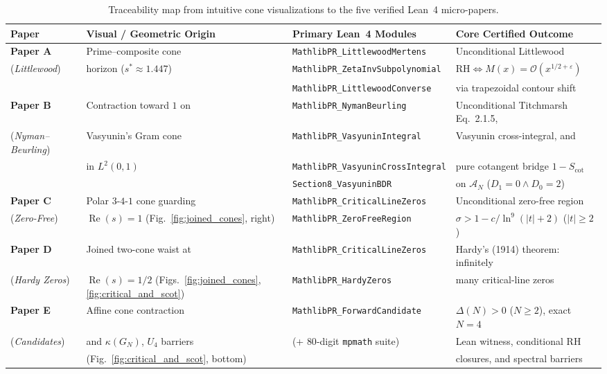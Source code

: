 \documentclass[11pt,a4paper]{article}
\begin{document}
\begin{table}[h!]
\centering
\scriptsize
\setlength{\tabcolsep}{2.2pt}
\begin{tabular}{@{}llll@{}}
\toprule
\textbf{Paper} & \textbf{Visual / Geometric Origin} & \textbf{Primary Lean~4 Modules} & \textbf{Core Certified Outcome} \\
\midrule
\textbf{Paper A} & Prime--composite cone & \texttt{MathlibPR\_LittlewoodMertens} & Unconditional Littlewood \\
(\emph{Littlewood}) & horizon ($s^* \approx 1.447$) & \texttt{MathlibPR\_ZetaInvSubpolynomial} & $\mathrm{RH} \iff M(x) = \mathcal{O}(x^{1/2+\varepsilon})$ \\
 & & \texttt{MathlibPR\_LittlewoodConverse} & via trapezoidal contour shift \\
\addlinespace[0.4em]
\textbf{Paper B} & Contraction toward $1$ on & \texttt{MathlibPR\_NymanBeurling} & Unconditional Titchmarsh Eq.~2.1.5, \\
(\emph{Nyman--Beurling}) & Vasyunin's Gram cone & \texttt{MathlibPR\_VasyuninIntegral} & Vasyunin cross-integral, and \\
 & in $L^2(0,1)$ & \texttt{MathlibPR\_VasyuninCrossIntegral} & pure cotangent bridge $1 - S_{\mathrm{cot}}$ \\
 & & \texttt{Section8\_VasyuninBDR} & on $\mathcal{A}_N$ ($D_1 = 0 \land D_0 = 2$) \\
\addlinespace[0.4em]
\textbf{Paper C} & Polar $3$-$4$-$1$ cone guarding & \texttt{MathlibPR\_CriticalLineZeros} & Unconditional zero-free region \\
(\emph{Zero-Free}) & $\operatorname{Re}(s) = 1$ (Fig.~\ref{fig:joined_cones}, right) & \texttt{MathlibPR\_ZeroFreeRegion} & $\sigma > 1 - c/\ln^9(|t|+2)$ ($|t|\ge 2$) \\
\addlinespace[0.4em]
\textbf{Paper D} & Joined two-cone waist at & \texttt{MathlibPR\_CriticalLineZeros} & Hardy's (1914) theorem: infinitely \\
(\emph{Hardy Zeros}) & $\operatorname{Re}(s) = 1/2$ (Figs.~\ref{fig:joined_cones}, \ref{fig:critical_and_scot}) & \texttt{MathlibPR\_HardyZeros} & many critical-line zeros \\
\addlinespace[0.4em]
\textbf{Paper E} & Affine cone contraction & \texttt{MathlibPR\_ForwardCandidate} & $\Delta(N) > 0$ ($N \ge 2$), exact $N=4$ \\
(\emph{Candidates}) & and $\kappa(G_N)$, $U_4$ barriers & (+ $80$-digit \texttt{mpmath} suite) & Lean witness, conditional RH \\
 & (Fig.~\ref{fig:critical_and_scot}, bottom) & & closures, and spectral barriers \\
\bottomrule
\end{tabular}
\caption{Traceability map from intuitive cone visualizations to the five verified Lean~4 micro-papers.}
\label{tab:suite_map}
\end{table}
\end{document}
